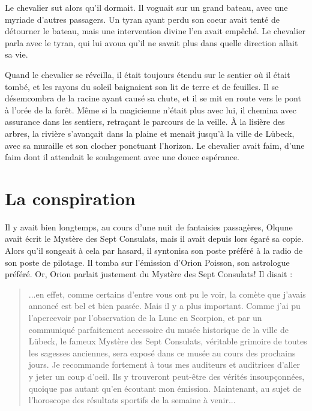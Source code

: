 \documentclass[a4paper,11pt, openany]{book}
\begin{document}
Le chevalier sut alors qu'il dormait. Il voguait sur un grand bateau, avec une myriade d'autres passagers. 
Un tyran ayant perdu son coeur avait tenté de détourner le bateau, mais une intervention divine l'en avait empêché.
Le chevalier parla avec le tyran, qui lui avoua qu'il ne savait plus dans quelle direction allait sa vie.   

Quand le chevalier se réveilla, il était toujours étendu sur le sentier où il était tombé, et les rayons du soleil
baignaient son lit de terre et de feuilles. Il se désemcombra de la racine ayant causé sa chute, et il se mit en route vers le pont à l'orée de la forêt.
Même si la magicienne n'était plus avec lui, il chemina avec assurance dans les sentiers, retraçant le parcours de la veille.
À la lisière des arbres, la rivière s'avançait dans la plaine et menait jusqu'à la ville de Lübeck, avec sa muraille et son clocher ponctuant l'horizon. 
Le chevalier avait faim, d'une faim dont il attendait le soulagement avec une douce espérance.

\chapter{La conspiration}

Il y avait bien longtemps, au cours d'une nuit de fantaisies passagères, Olqune avait écrit le Mystère des Sept Consulats, mais il avait depuis lors égaré sa copie.
Alors qu'il songeait à cela par hasard, il syntonisa son poste préféré à la radio de son poste de pilotage. Il tomba sur l'émission d'Orion Poisson, son astrologue préféré.
Or, Orion parlait justement du Mystère des Sept Consulats! Il disait : 

\begin{quote}
...en effet, comme certains d'entre vous ont pu le voir, la comète que j'avais annoncé est bel et bien passée. Mais il y a plus important. Comme j'ai pu l'apercevoir par l'observation de la Lune en Scorpion,
et par un communiqué parfaitement accessoire du musée historique de la ville de Lübeck, le fameux Mystère des Sept Consulats, véritable grimoire de toutes les sagesses anciennes, sera exposé dans ce musée au cours des prochains jours.
Je recommande fortement à tous mes auditeurs et auditrices d'aller y jeter un coup d'oeil. Ils y trouveront peut-être des vérités insoupçonnées, quoique pas autant qu'en écoutant mon émission. Maintenant, au sujet de l'horoscope des résultats sportifs de la semaine à venir...
\end{quote}
\end{document}
